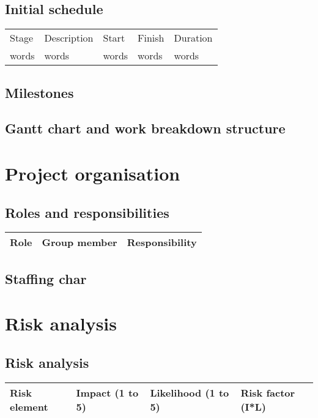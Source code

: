\documentclass[a4paper, 12pt]{article}
\begin{document}
		\subsection{Initial schedule}
			\begin{tabular}{ p{30 mm} p{40 mm} p{10 mm} p{10 mm} p{15 mm} }
				\toprule
				Stage & Description & Start & Finish & Duration \\
				words & words & words & words & words \\
				\bottomrule
			\end{tabular}
		\subsection{Milestones}

		\subsection{Gantt chart and work breakdown structure}

	\newpage
	\section{Project organisation}
		\subsection{Roles and responsibilities}
			\begin{tabular}{p{30 mm} p{30 mm} p{30 mm}}
				\toprule
					Role & Group member & Responsibility \\
				\bottomrule
			\end{tabular}

		\subsection{Staffing char}

	\newpage
	\section{Risk analysis}
		\subsection{Risk analysis}
			\begin{tabular}{p{30 mm} p{30 mm} p{30 mm} p{30 mm}}
				\toprule
					Risk element & Impact (1 to 5) & Likelihood (1 to 5) & Risk factor (I*L) \\
				\bottomrule
			\end{tabular}
\end{document}
